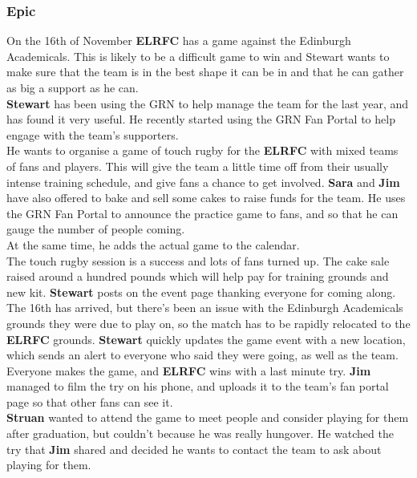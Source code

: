 \documentclass[10pt,a4paper]{article}
\begin{document}
\subsubsection{Epic}
On the 16th of November \textbf{ELRFC} has a game against the Edinburgh Academicals. This is likely to be a difficult game to win and Stewart wants to make sure that the team is in the best shape it can be in and that he can gather as big a support as he can. \\

\textbf{Stewart} has been using the GRN to help manage the team for the last year, and has found it very useful. He recently started using the GRN Fan Portal to help engage with the team’s supporters. \\

He wants to organise a game of touch rugby for the \textbf{ELRFC} with mixed teams of fans and players. This will give the team a little time off from their usually intense training schedule, and give fans a chance to get involved. \textbf{Sara} and \textbf{Jim} have also offered to bake and sell some cakes to raise funds for the team. He uses the GRN Fan Portal to announce the practice game to fans, and so that he can gauge the number of people coming. \\

At the same time, he adds the actual game to the calendar. \\

The touch rugby session is a success and lots of fans turned up. The cake sale raised around a hundred pounds which will help pay for training grounds and new kit. \textbf{Stewart} posts on the event page thanking everyone for coming along.\\

The 16th has arrived, but there’s been an issue with the Edinburgh Academicals grounds they were due to play on, so the match has to be rapidly relocated to the \textbf{ELRFC} grounds. \textbf{Stewart} quickly updates the game event with a new location, which sends an alert to everyone who said they were going, as well as the team. Everyone makes the game, and \textbf{ELRFC} wins with a last minute try. \textbf{Jim} managed to film the try on his phone, and uploads it to the team’s fan portal page so that other fans can see it. \\

\textbf{Struan}  wanted to attend the game to meet people and consider playing for them after graduation, but couldn’t because he was really hungover. He watched the try that \textbf{Jim} shared and decided he wants to contact the team to ask about playing for them. \\
\end{document}
